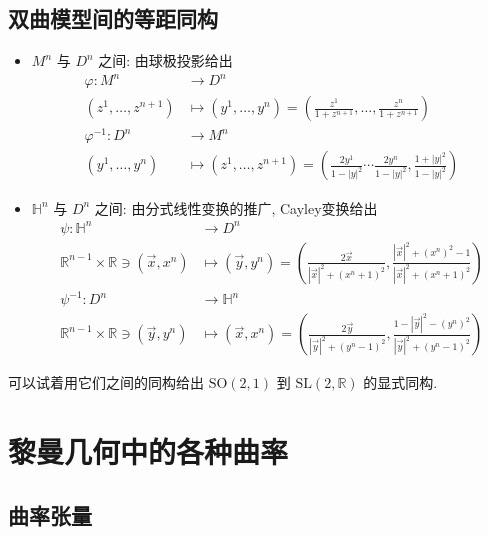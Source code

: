 \subsection{双曲模型间的等距同构}
    \begin{itemize}
        \item $M^n$ 与 $D^n$ 之间: 由球极投影给出
        \begin{align*}
            \varphi:M^n&\rightarrow D^n \\
            \left(z^1,\dots,z^{n+1}\right)&\mapsto\left(y^1,\dots,y^n\right)=\left(\frac{z^1}{1+z^{n+1}},\dots,\frac{z^n}{1+z^{n+1}}\right) \\
            \varphi^{-1}:D^n&\rightarrow M^n \\
            \left(y^1,\dots,y^n\right)&\mapsto\left(z^1,\dots,z^{n+1}\right)=\left(\frac{2y^1}{1-|y|^2}\cdots\frac{2y^n}{1-|y|^2},\frac{1+|y|^2}{1-|y|^2}\right)
        \end{align*}
        \item $\mathbb{H}^n$ 与 $D^n$ 之间: 由分式线性变换的推广, Cayley变换给出
        \begin{align*}
            \psi:\mathbb{H}^n&\rightarrow D^n \\
            \mathbb{R}^{n-1}\times\mathbb{R}\ni\left(\vec{x},x^n\right)&\mapsto\left(\vec{y},y^n\right)=\left(\frac{2\vec{x}}{|\vec{x}|^2+(x^n+1)^2},\frac{|\vec{x}|^2+(x^n)^2-1}{|\vec{x}|^2+(x^n+1)^2}\right) \\
            \psi^{-1}:D^n&\rightarrow\mathbb{H}^n \\
            \mathbb{R}^{n-1}\times\mathbb{R}\ni\left(\vec{y},y^n\right)&\mapsto\left(\vec{x},x^n\right)=\left(\frac{2\vec{y}}{|\vec{y}|^2+(y^n-1)^2},\frac{1-|\vec{y}|^2-(y^n)^2}{|\vec{y}|^2+(y^n-1)^2}\right)
        \end{align*}
    \end{itemize}
    可以试着用它们之间的同构给出 $\mathrm{SO}(2,1)$ 到 $\mathrm{SL}(2,\mathbb{R})$ 的显式同构.

\section{黎曼几何中的各种曲率}
\subsection{曲率张量}
